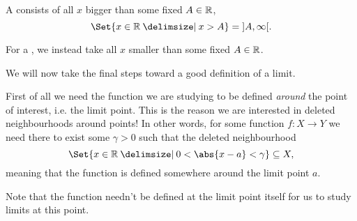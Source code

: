 \begin{example}
	A  consists of all $x$ bigger than some fixed $A \in \mathbb{R}$,
	\[
		\Set{x \in \R \given x > A} = {]{A, \infty}[}.
	\]

	\begin{figure}[H]
		\centering
	\end{figure}

	\noindent
	For a , we instead take all $x$ smaller than some fixed $A \in \mathbb{R}$.
\end{example}


We will now take the final steps toward a good definition of a limit.

 First of all we need the function we are studying to be defined \emph{around} the point of interest, i.e. the limit point. This is the reason we are interested in deleted neighbourhoods around points! In other words, for some function $f \colon X \to Y$ we need there to exist some $\gamma > 0$ such that the deleted neighbourhood
\[
	\Set{x \in \R \given 0 < \abs{x - a} < \gamma} \subseteq X,
\]
meaning that the function is defined somewhere around the limit point $a$.

\begin{remark}
	Note that the function needn't be defined at the limit point itself for us to study limits at this point.
\end{remark}

